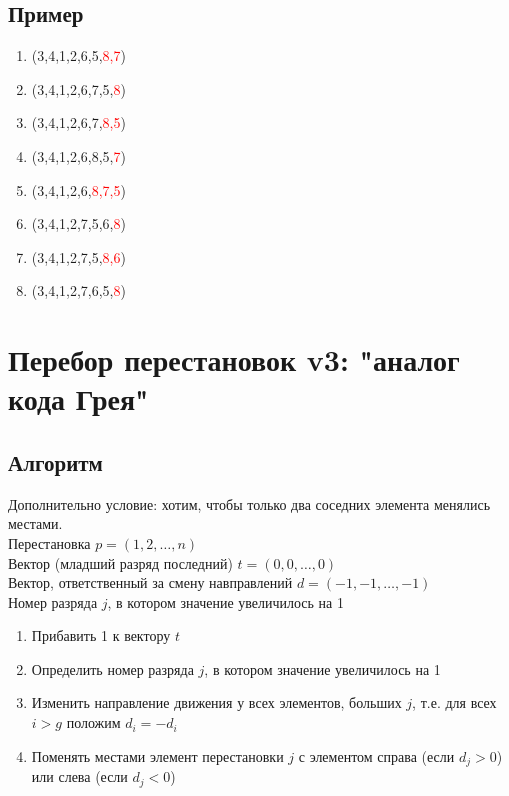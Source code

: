 \documentclass[main]{subfiles}
\begin{document}
\subsection{Пример}
\begin{enumerate}
    \item (3,4,1,2,6,5,\textcolor{red}{8,7})
    \item (3,4,1,2,6,7,5,\textcolor{red}{8})
    \item (3,4,1,2,6,7,\textcolor{red}{8,5})
    \item (3,4,1,2,6,8,5,\textcolor{red}{7})
    \item (3,4,1,2,6,\textcolor{red}{8,7,5})
    \item (3,4,1,2,7,5,6,\textcolor{red}{8})
    \item (3,4,1,2,7,5,\textcolor{red}{8,6})
    \item (3,4,1,2,7,6,5,\textcolor{red}{8})
\end{enumerate}

\section{Перебор перестановок v3: "аналог кода Грея"}
\subsection{Алгоритм}
Дополнительно условие: хотим, чтобы только два соседних элемента менялись 
местами. \\
Перестановка $p = (1, 2, \ldots, n)$ \\
Вектор (младший разряд последний) $t = (0, 0, \ldots, 0)$ \\
Вектор, ответственный за смену навправлений $d = (-1, -1, \ldots, -1)$ \\
Номер разряда $j$, в котором значение увеличилось на 1
\begin{enumerate}
    \item Прибавить 1 к вектору $t$
    \item Определить номер разряда $j$, в котором значение увеличилось на 1
    \item Изменить направление движения у всех элементов, больших $j$, т.е.
для всех $i > g$ положим $d_i = -d_i$
    \item Поменять местами элемент перестановки $j$ с элементом справа
(если $d_j > 0$) или слева (если $d_j < 0$)
\end{enumerate}
\end{document}
